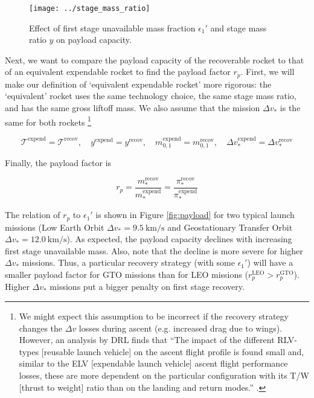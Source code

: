 \documentclass[conf]{new-aiaa}
\begin{document}
\begin{figure}[hbt!]
	\centering
	\texttt{[image: ../stage\_mass\_ratio]}
	\caption{\label{fig:stage_mass_ratio} Effect of first stage unavailable mass fraction $\epsilon_1'$ and stage mass ratio $y$ on payload capacity.}
\end{figure}

Next, we want to compare the payload capacity of the recoverable rocket to that of an equivalent expendable rocket to find the payload factor $r_p$. First, we will make our definition of `equivalent expendable rocket' more rigorous: the `equivalent' rocket uses the same technology choice, the same stage mass ratio, and has the same gross liftoff mass. We also assume that the mission $\Delta v_*$ is the same for both rockets \footnote{We might expect this assumption to be incorrect if the recovery strategy changes the $\Delta v$ losses during ascent (e.g. increased drag due to wings). However, an analysis by DRL finds that ``The impact of the different RLV-types [reusable launch vehicle] on the ascent flight profile is found small and, similar to the ELV [expendable launch vehicle] ascent flight performance losses, these are more dependent on the particular configuration with its T/W [thrust to weight] ratio than on the landing and return modes.'' \cite{Stappert2017}.}

\begin{equation}
\mathcal{T}^{\mathrm{expend}} = \mathcal{T}^{\mathrm{recov}}, \quad y^{\mathrm{expend}} = y^{\mathrm{recov}}, \quad m_{0,1}^{\mathrm{expend}} = m_{0,1}^{\mathrm{recov}}, \quad \Delta v_*^{\mathrm{expend}} = \Delta v_*^{\mathrm{recov}}
\end{equation}

Finally, the payload factor is

\begin{equation}
r_p = \frac{m_*^{\mathrm{recov}}}{m_*^{\mathrm{expend}}} = \frac{\pi_*^{\mathrm{recov}}}{\pi_*^{\mathrm{expend}}}
\end{equation}

The relation of $r_p$ to $\epsilon_1'$ is shown in Figure \ref{fig:payload} for two typical launch missions (Low Earth Orbit $\Delta v_* = \SI{9.5}{\kilo\meter\per\second}$ and Geostationary Transfer Orbit $\Delta v_* = \SI{12.0}{\kilo\meter\per\second}$). As expected, the payload capacity declines with increasing first stage unavailable mass. Also, note that the decline is more severe for higher $\Delta v_*$ missions. Thus, a particular recovery strategy (with some $\epsilon_1'$) will have a smaller payload factor for GTO missions than for LEO missions ($r_p^{\mathrm{LEO}} > r_p^\mathrm{GTO}$). Higher $\Delta v_*$ missions put a bigger penalty on first stage recovery. 
\end{document}
